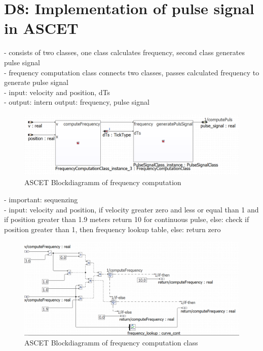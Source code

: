 \chapter{D8: Implementation of pulse signal in ASCET}\label{cha:D8}

- consists of two classes, one class calculates frequency, second class generates pulse signal \\
- frequency computation class connects two classes, passes calculated frequency to generate pulse signal \\
- input: velocity and position, dTs \\
- output: intern output: frequency, pulse signal \\

\begin{figure}[H]
\centering
\includegraphics[width=1\textwidth]{images/Blockdiagramm_FrequencyComputation.png}
\caption{ASCET Blockdiagramm of frequency computation}
\label{fig:BlockdiagrammFrequencyComputation}
\end{figure}

- important: sequenzing \\
- input: velocity and position, if velocity greater zero and less or equal than 1 and if position greater than 1.9 meters return 10 for continuous pulse, else: check if position greater than 1, then frequency lookup table, else: return zero \\
\begin{figure}[H]
\centering
\includegraphics[width=1\textwidth]{images/Blockdiagramm_FrequencyComputationClass.png}
\caption{ASCET Blockdiagramm of frequency computation class}
\label{fig:BlockdiagrammFrequencyComputationClass}
\end{figure}

